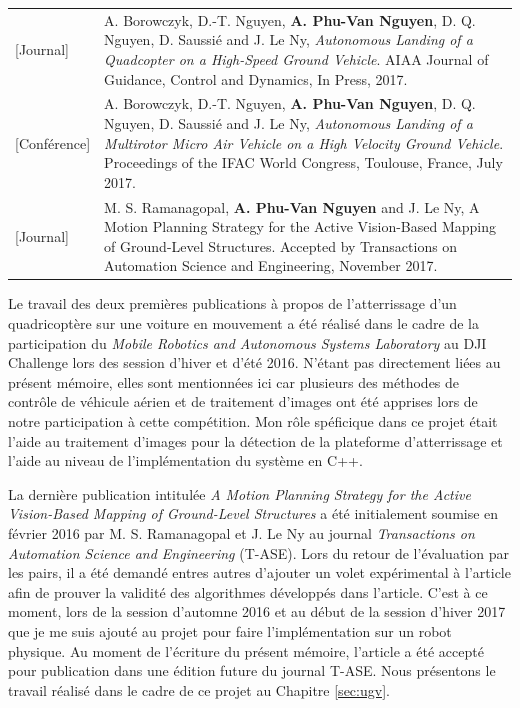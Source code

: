 \begin{longtable}{lp{5in}}
  [Journal]     & A. Borowczyk, D.-T. Nguyen, \textbf{A. Phu-Van Nguyen}, D. Q. Nguyen, D. Saussié and J. Le Ny, \textit{Autonomous Landing of a Quadcopter on a High-Speed Ground Vehicle}. AIAA Journal of Guidance, Control and Dynamics, In Press, 2017.\\

  [Conférence]  & A. Borowczyk, D.-T. Nguyen, \textbf{A. Phu-Van Nguyen}, D. Q. Nguyen, D. Saussié and J. Le Ny, \textit{Autonomous Landing of a Multirotor Micro Air Vehicle on a High Velocity Ground Vehicle}. Proceedings of the IFAC World Congress, Toulouse, France, July 2017.\\

  [Journal]      & M. S. Ramanagopal, \textbf{A. Phu-Van Nguyen} and J. Le Ny, A Motion Planning Strategy for the Active Vision-Based Mapping of Ground-Level Structures. Accepted by Transactions on Automation Science and Engineering, November 2017.
\end{longtable}

Le travail des deux premières publications à propos de l'atterrissage d'un quadricoptère sur une voiture en mouvement a été réalisé dans le cadre de la participation du \textit{Mobile Robotics and Autonomous Systems Laboratory} au DJI Challenge lors des session d'hiver et d'été 2016. N'étant pas directement liées au présent mémoire, elles sont mentionnées ici car plusieurs des méthodes de contrôle de véhicule aérien et de traitement d'images ont été apprises lors de notre participation à cette compétition. Mon rôle spéficique dans ce projet était l'aide au traitement d'images pour la détection de la plateforme d'atterrissage et l'aide au niveau de l'implémentation du système en C++.

La dernière publication intitulée \textit{A Motion Planning Strategy for the Active Vision-Based Mapping of Ground-Level Structures} a été initialement soumise en février 2016 par M. S. Ramanagopal et J. Le Ny au journal \textit{Transactions on Automation Science and Engineering} (T-ASE). Lors du retour de l'évaluation par les pairs, il a été demandé entres autres d'ajouter un volet expérimental à l'article afin de prouver la validité des algorithmes développés dans l'article. C'est à ce moment, lors de la session d'automne 2016 et au début de la session d'hiver 2017 que je me suis ajouté au projet pour faire l'implémentation sur un robot physique. Au moment de l'écriture du présent mémoire, l'article a été accepté pour publication dans une édition future du journal T-ASE. Nous présentons le travail réalisé dans le cadre de ce projet au Chapitre \ref{sec:ugv}.


